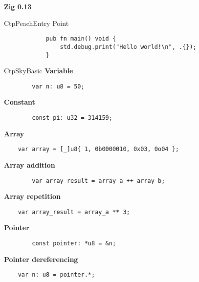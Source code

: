 \documentclass[10pt,a4paper]{article}
\begin{document}
	\small
		\begin{multicols*}{3}

		\LARGE\centering\textcolor{CtpPeach}{\textbf{Zig 0.13}}
		\vspace{2cm}
		\normalsize
		\begin{mycolorbox}{CtpPeach}{Entry Point}
			\begin{verbatim}
			pub fn main() void {
				std.debug.print("Hello world!\n", .{});
			}
			\end{verbatim}
		\end{mycolorbox}
\begin{mycolorbox}{CtpSky}{Basic}
	\textbf{Variable}
	\begin{verbatim}
		var n: u8 = 50;
	\end{verbatim}

	\textbf{Constant}
	\begin{verbatim}
		const pi: u32 = 314159;
	\end{verbatim}

	\textbf{Array}
	\begin{verbatim}
	var array = [_]u8{ 1, 0b0000010, 0x03, 0o04 };
	\end{verbatim}

	\textbf{Array addition}
	\begin{verbatim}
		var array_result = array_a ++ array_b;
	\end{verbatim}

	\textbf{Array repetition}
	\begin{verbatim}
	var array_result = array_a ** 3;
	\end{verbatim}

	\textbf{Pointer}
	\begin{verbatim}
		const pointer: *u8 = &n;
	\end{verbatim}

	\textbf{	Pointer dereferencing}
	\begin{verbatim}
	var n: u8 = pointer.*;
	\end{verbatim}


\end{mycolorbox}
\end{multicols*}
\end{document}
